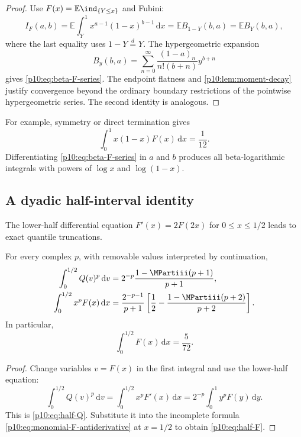 \documentclass[11pt,oneside]{article}
\theoremstyle{definition}
\theoremstyle{remark}
\newcommand{\F}{F}
\newcommand{\Q}{Q}
\newcommand{\E}{\mathbb E}
\newcommand{\dd}{\,\mathrm d}
\newcommand{\1}{\mathbf 1}
\begin{document}
\begin{proof}
Use \(\F(x)=\E\ind_{\{Y\le x\}}\) and Fubini:
\[
 I_F(a,b)=\E\int_Y^1x^{a-1}(1-x)^{b-1}\dd x
 =\E B_{1-Y}(b,a)=\E B_Y(b,a),
\]
where the last equality uses \(1-Y\overset d=Y\).  The hypergeometric expansion
\[
 B_y(b,a)=\sum_{n=0}^{\infty}
 \frac{(1-a)_n}{n!(b+n)}y^{b+n}
\]
gives \cref{p10:eq:beta-F-series}.  The endpoint flatness and
\cref{p10:lem:moment-decay} justify convergence beyond the ordinary boundary restrictions
of the pointwise hypergeometric series.  The second identity is analogous.
\end{proof}

For example, symmetry or direct termination gives
\begin{equation}\label{p10:eq:beta-example}
 \int_0^1x(1-x)\F(x)\dd x=\frac1{12}.
\end{equation}
Differentiating \cref{p10:eq:beta-F-series} in \(a\) and \(b\) produces all beta-logarithmic
integrals with powers of \(\log x\) and \(\log(1-x)\).

\subsection{A dyadic half-interval identity}

The lower-half differential equation \(\F'(x)=2\F(2x)\) for \(0\le x\le1/2\)
leads to exact quantile truncations.

\begin{proposition}\label{p10:prop:half-identities}
For every complex \(p\), with removable values interpreted by continuation,
\begin{align}
 \int_0^{1/2}\Q(v)^p\dd v
 &=2^{-p}\frac{1-\MPartiii(p+1)}{p+1},
 \label{p10:eq:half-Q}\\
 \int_0^{1/2}x^p\F(x)\dd x
 &=\frac{2^{-p-1}}{p+1}
 \left[\frac12-\frac{1-\MPartiii(p+2)}{p+2}\right].
 \label{p10:eq:half-F}
\end{align}
In particular,
\begin{equation}\label{p10:eq:half-F-zero}
 \int_0^{1/2}\F(x)\dd x=\frac5{72}.
\end{equation}
\end{proposition}

\begin{proof}
Change variables \(v=\F(x)\) in the first integral and use the lower-half equation:
\[
 \int_0^{1/2}\Q(v)^p\dd v
 =\int_0^{1/2}x^p\F'(x)\dd x
 =2^{-p}\int_0^1y^p\F(y)\dd y.
\]
This is \cref{p10:eq:half-Q}.  Substitute it into the incomplete formula
\cref{p10:eq:monomial-F-antiderivative} at \(x=1/2\) to obtain \cref{p10:eq:half-F}.
\end{proof}
\end{document}
